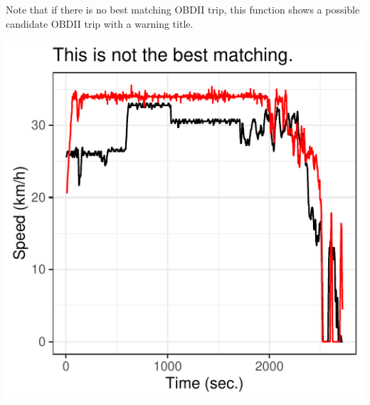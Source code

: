 \documentclass[letterpaper,9pt,twocolumn,twoside,]{pinp}
\begin{document}
Note that if there is no best matching OBDII trip, this function shows a
possible candidate OBDII trip with a warning title.

\begin{Shaded}
\begin{Highlighting}[]
\StringTok{ }\NormalTok{mobile_data[[}\NormalTok{]]}

\StringTok{ }

\end{Highlighting}
\end{Shaded}

\begin{center}\includegraphics{report_issaclee_files/figure-latex/unnamed-chunk-9-1} \end{center}





\end{document}
